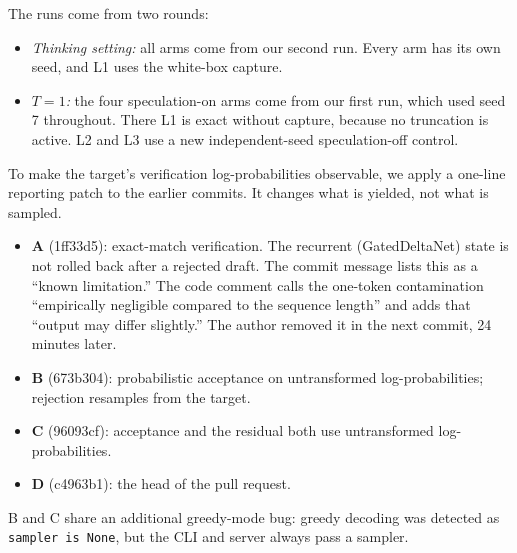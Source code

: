 \documentclass[10pt]{article}
\theoremstyle{remark}
\begin{document}
The runs come from two rounds:
\begin{itemize}
\item \emph{Thinking setting:} all arms come from our second run. Every arm has its own seed, and L1 uses the white-box capture.
\item \emph{$T{=}1$:} the four speculation-on arms come from our first run, which used seed 7 throughout. There L1 is exact without capture, because no truncation is active. L2 and L3 use a new independent-seed speculation-off control.
\end{itemize}
To make the target's verification log-probabilities observable, we apply a one-line reporting patch to the earlier commits. It changes what is yielded, not what is sampled.

\begin{itemize}
\item \textbf{A} (1ff33d5): exact-match verification. The recurrent (GatedDeltaNet) state is not rolled back after a rejected draft. The commit message lists this as a ``known limitation.'' The code comment calls the one-token contamination ``empirically negligible compared to the sequence length'' and adds that ``output may differ slightly.'' The author removed it in the next commit, 24 minutes later.
\item \textbf{B} (673b304): probabilistic acceptance on untransformed log-probabilities; rejection resamples from the target.
\item \textbf{C} (96093cf): acceptance and the residual both use untransformed log-probabilities.
\item \textbf{D} (c4963b1): the head of the pull request.
\end{itemize}
B and C share an additional greedy-mode bug: greedy decoding was detected as \texttt{sampler is None}, but the CLI and server always pass a sampler.
\end{document}
